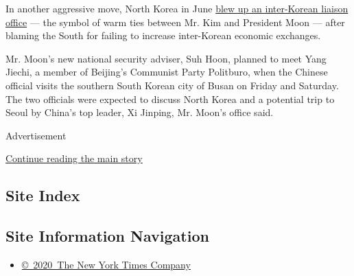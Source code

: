 In another aggressive move, North Korea in June
\href{https://www.nytimes3xbfgragh.onion/2020/06/16/world/asia/north-korea-explosion-liaison-office.html}{blew
up an inter-Korean liaison office} --- the symbol of warm ties between
Mr. Kim and President Moon --- after blaming the South for failing to
increase inter-Korean economic exchanges.

Mr. Moon's new national security adviser, Suh Hoon, planned to meet Yang
Jiechi, a member of Beijing's Communist Party Politburo, when the
Chinese official visits the southern South Korean city of Busan on
Friday and Saturday. The two officials were expected to discuss North
Korea and a potential trip to Seoul by China's top leader, Xi Jinping,
Mr. Moon's office said.

Advertisement

\protect\hyperlink{after-bottom}{Continue reading the main story}

\hypertarget{site-index}{%
\subsection{Site Index}\label{site-index}}

\hypertarget{site-information-navigation}{%
\subsection{Site Information
Navigation}\label{site-information-navigation}}

\begin{itemize}
\tightlist
\item
  \href{https://help.nytimes3xbfgragh.onion/hc/en-us/articles/115014792127-Copyright-notice}{©~2020~The
  New York Times Company}
\end{itemize}

